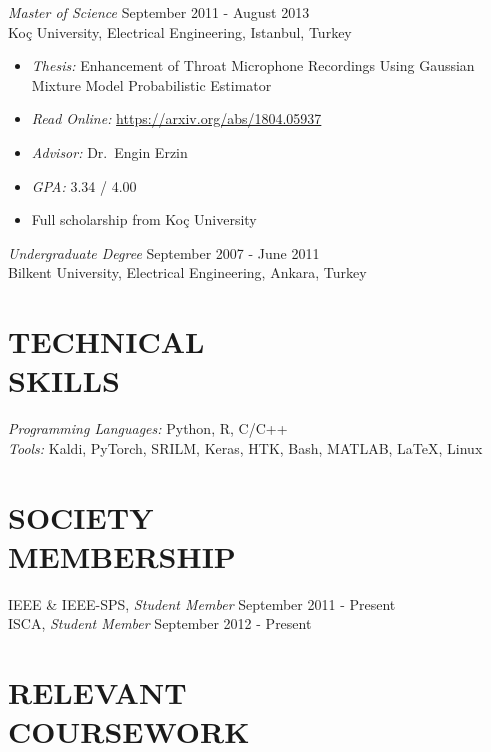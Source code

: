\documentclass[margin, 10pt]{res} %
\begin{document}
\begin{resume}
{\sl Master of Science} \hfill September 2011 - August 2013 \\[.3em]
Ko\c{c} University, Electrical Engineering, Istanbul, Turkey \vspace{.3em}
\begin{itemize}
\item \textit{Thesis:} Enhancement of Throat Microphone Recordings Using Gaussian \\ Mixture Model Probabilistic Estimator
\item \textit{Read Online:} \url{https://arxiv.org/abs/1804.05937}
\item \textit{Advisor:} Dr.~Engin Erzin
\item \textit{GPA:} 3.34 / 4.00
\item Full scholarship from Ko\c{c} University
\end{itemize}

{\sl Undergraduate Degree} \hfill September 2007 - June 2011 \\[.3em]
Bilkent University, Electrical Engineering, Ankara, Turkey \vspace{.3em}
\begin{itemize}
\end{itemize}

\vspace{1em}
\section{TECHNICAL \\ SKILLS}

{\sl Programming Languages:} Python, R, C/C++ \\
{\sl Tools:} Kaldi, PyTorch, SRILM, Keras, HTK, Bash, MATLAB, \LaTeX, Linux \\

\section{SOCIETY \\ MEMBERSHIP}

IEEE \& IEEE-SPS, {\sl Student Member} \hfill September 2011 - Present \\
ISCA, {\sl Student Member} \hfill September 2012 - Present

\vspace{1em}
\section{RELEVANT \\ COURSEWORK}


\end{resume}
\end{document}
